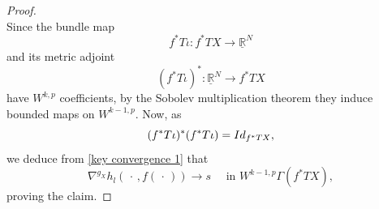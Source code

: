 \documentclass[10pt,a4paper]{amsart}
\newcommand{\bR}{\mathbb{R}}
\newcommand{\id}{\textnormal{Id}}
\begin{document}
\begin{proof}
\begin{equation}
  \end{equation}
  Since the bundle map 
  \begin{equation*}
    f^*T \iota: f^*TX \to \underline{\bR}^N
  \end{equation*}
  and its metric adjoint
  \begin{equation*}
    (f^*T \iota)^*: \underline{\bR}^N \to f^*TX
  \end{equation*} 
  have $W^{k,p}$ coefficients, by the Sobolev multiplication theorem they induce bounded maps on $W^{k-1,p}$. Now, as
  \begin{equation*}
    (f^*T \iota)^* (f^*T \iota )= \id_{f^*TX},
  \end{equation*} 
  we deduce from \eqref{key convergence 1} that 
  \begin{equation*}
    \nabla^{g_X} h_l( \, \cdot \, , f(\, \cdot \, )) \to s \quad \text{ in } W^{k-1, p}\Gamma(f^*TX),
  \end{equation*}
  proving the claim.
\end{proof}
\end{document}
